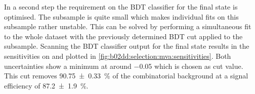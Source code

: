 In a second step the requirement on the BDT classifier for the \KKpiKpipi
final state is optimised. The \KKpiKpipi subsample is quite small which makes
individual fits on this subsample rather unstable. This can be solved by
performing a simultaneous fit to the whole dataset with the previously
determined BDT cut applied to the \KpipiKpipi subsample. Scanning the BDT
classifier output for the \KKpiKpipi final state results in the sensitivities
on \SDD and \CDD plotted in \cref{fig:b02dd:selection:mva:sensitivities}. Both
uncertainties show a minimum at around \num{-0.05} which is chosen as cut
value. This cut removes \SI{90.75\pm0.33}{\percent} of the combinatorial
background at a signal efficiency of \SI{87.2\pm1.9}{\percent}.

\clearpage
